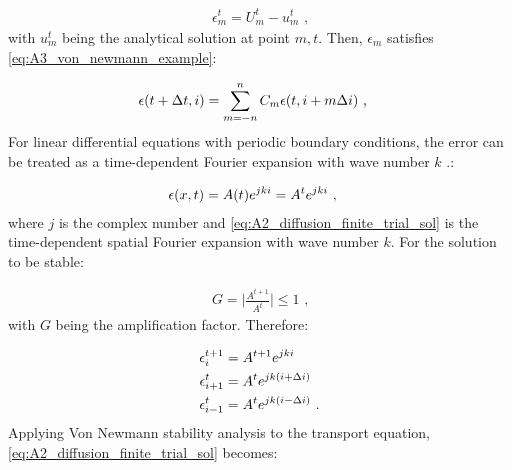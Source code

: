 \begin{equation}
    \begin{aligned}
        \epsilon_m^t=U_m^t-u_m^t\text{ ,} 
    \end{aligned} \label{eq:A2_error_function}
\end{equation}
\noindent with $u_m^t$ being the analytical solution at point $m,t$. Then, $\epsilon_m$ satisfies \autoref{eq:A3_von_newmann_example}:

\begin{equation}
    \begin{aligned}
        \epsilon \qty(t+\Delta t, i)&=\sum_{m=-n}^n C_m \epsilon\qty(t,i+m\Delta i)\text{ ,} 
    \end{aligned} \label{eq:A3_von_newmann_example}
\end{equation}
\noindent For linear differential equations with periodic boundary conditions, the error can be treated as a time-dependent Fourier expansion with wave number $k$ \citep{cdi_wiley_ebooks_10_1002_9783527683147_ch11_ch11}.:

\begin{equation}
    \begin{aligned}
    \epsilon\qty(x,t)&=A\qty(t)e^{jki}=A^te^{jki}\text{ ,} 
    \end{aligned} \label{eq:A2_diffusion_finite_trial_sol}
\end{equation}
\noindent where $j$ is the complex number and \autoref{eq:A2_diffusion_finite_trial_sol} is the time-dependent spatial Fourier expansion with wave number $k$. For the solution to be stable:

\begin{equation}
    \begin{aligned}
        G=\bigg| \frac{A^{t+1}}{A^t}\bigg| \leq 1\text{ ,} 
    \end{aligned}
\end{equation} 
\noindent with $G$ being the amplification factor. Therefore:

\begin{equation}
    \begin{aligned}
    \epsilon_i^{t+1}&= A^{t+1}e^{jki} \\
    \epsilon_{i+1}^{t}&= A^{t}e^{jk\qty(i+\Delta i)} \\
    \epsilon_{i-1}^{t}&= A^{t}e^{jk\qty(i-\Delta i)}\text{ .} 
    \end{aligned} \label{eq:A2_diffusion_finite_trial_sol2}
\end{equation}
Applying Von Newmann stability analysis to the transport equation, \autoref{eq:A2_diffusion_finite_trial_sol} becomes:

